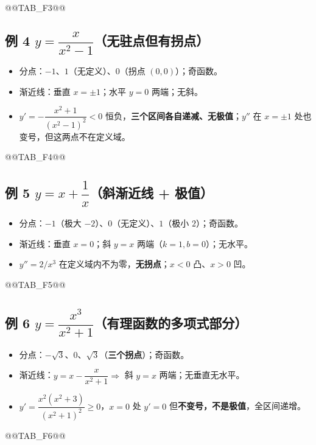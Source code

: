 \documentclass[11pt,a4paper]{ctexart}
\begin{document}
@@TAB_F3@@

\subsection{例 4 $y=\dfrac{x}{x^2-1}$（无驻点但有拐点）}

\begin{itemize}[label=$\bullet$,leftmargin=1.5em]
\item 分点：$-1$、$1$（无定义）、$0$（拐点 $(0,0)$）；奇函数。
\item 渐近线：垂直 $x=\pm1$；水平 $y=0$ 两端；无斜。
\item $y'=-\dfrac{x^2+1}{(x^2-1)^2}<0$ 恒负，\textbf{三个区间各自递减、无极值}；$y''$ 在 $x=\pm1$ 处也变号，但这两点不在定义域。
\end{itemize}

@@TAB_F4@@

\subsection{例 5 $y=x+\dfrac1x$（斜渐近线 + 极值）}

\begin{itemize}[label=$\bullet$,leftmargin=1.5em]
\item 分点：$-1$（极大 $-2$）、$0$（无定义）、$1$（极小 $2$）；奇函数。
\item 渐近线：垂直 $x=0$；斜 $y=x$ 两端（$k=1,b=0$）；无水平。
\item $y''=2/x^3$ 在定义域内不为零，\textbf{无拐点}；$x<0$ 凸、$x>0$ 凹。
\end{itemize}

@@TAB_F5@@

\subsection{例 6 $y=\dfrac{x^3}{x^2+1}$（有理函数的多项式部分）}

\begin{itemize}[label=$\bullet$,leftmargin=1.5em]
\item 分点：$-\sqrt3$、$0$、$\sqrt3$（\textbf{三个拐点}）；奇函数。
\item 渐近线：$y=x-\dfrac{x}{x^2+1}\Rightarrow$ 斜 $y=x$ 两端；无垂直无水平。
\item $y'=\dfrac{x^2(x^2+3)}{(x^2+1)^2}\ge0$，$x=0$ 处 $y'=0$ 但\textbf{不变号，不是极值}，全区间递增。
\end{itemize}

@@TAB_F6@@
\end{document}
